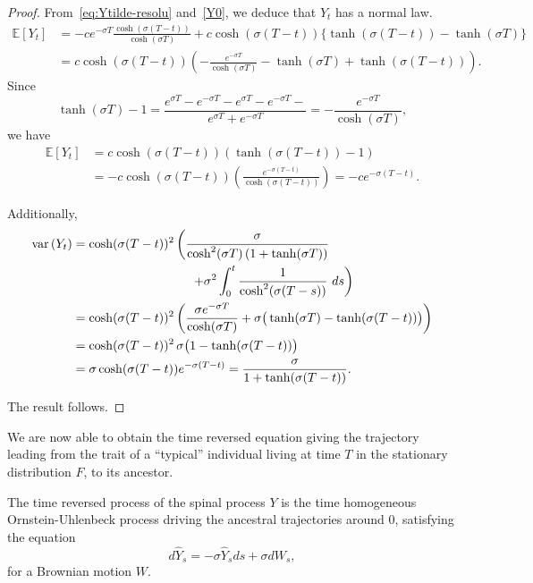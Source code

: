 \documentclass[10pt]{amsart}
\theoremstyle{definition}\newtheorem{defi}[theo]{Definition}\newtheorem{rema}[theo]{Remark}\newtheorem{exam}[theo]{Example}\newtheorem{exem}[theo]{Example}\newtheorem{nota}[theo]{Notation}
\newcommand*\E{\mathbb{E}}
\newcommand*\s{\sigma}
\begin{document}
\begin{proof}
From~\eqref{eq:Ytilde-resolu} and~\eqref{Y0}, we deduce that $Y_{t}$ has a normal law.
\begin{align*}
\E\left[Y_{t}\right]&=-ce^{-\s T}\frac{\cosh(\s(T-t))}{\cosh(\s T)}+c\cosh(\s(T-t))\big\{\tanh(\s (T-t))-\tanh(\s T) \big\}\\
&=c\cosh(\s (T-t))\left(-\frac{e^{-\s T}}{\cosh(\s T)}-\tanh(\s T)+\tanh(\s(T-t)) \right).
\end{align*}
Since
\begin{equation}\label{eq:1}
\tanh(\s T)-1=\frac{e^{\s T}-e^{-\s T}-e^{\s T}-e^{-\s T}-}{e^{\s T}+e^{-\s T}}=-\frac{e^{-\sigma T}}{\cosh(\s T)},
\end{equation}
we have
\begin{align*}
\E[Y_{t}]&=c\cosh(\s (T-t))\left(\tanh(\s(T-t))-1 \right)\\
&=-c\cosh(\s (T-t))\left(\frac{e^{-\s(T-t)}}{\cosh(\sigma (T-t))} \right)=-ce^{-\s(T-t)}.
\end{align*}

Additionally,
\begin{align*}
\text{var}\left({Y}_{t}\right)&=\cosh(\s (T-t))^{2}\left({\frac{\s}{\cosh^{2}(\s T)\left(1+\tanh(\s T)\right)}}\right.\\
&\mkern170mu\left.+{\s^{2}\int_{0}^{t}\frac{1}{\cosh^{2}(\s (T-s))}\ ds} \right)\\
&= \cosh(\s (T-t))^{2}\left(\frac{\s e^{-\s T}}{\cosh(\s T)}+ \sigma\big(\tanh(\sigma T)-\tanh(\s (T-t)) \big)\right)\\
&= \cosh(\s (T-t))^{2}\, \s\big(1-\tanh(\s(T-t))\big)\\
&=\sigma \cosh(\s(T-t))e^{-\s(T-t)}=\frac{\s}{1+\tanh(\s(T-t))}.
\end{align*}

The result follows.
\end{proof}


We are now able to obtain the time reversed equation giving the trajectory leading from the trait of a ``typical'' individual living at time $T$ in the stationary distribution $F$, to its ancestor.

\begin{prop}\label{reversed:2}
The time reversed process of the spinal process $ Y$ is the time homogeneous Ornstein-Uhlenbeck process driving the ancestral trajectories around $0$, satisfying the equation
\begin{equation}\label{rev-spine:OU}
d\widehat{Y}_{s}=-\sigma \widehat{Y}_{s}ds +\sigma d W_{s},
\end{equation}
for a Brownian motion $W$.
\end{prop}
\end{document}
